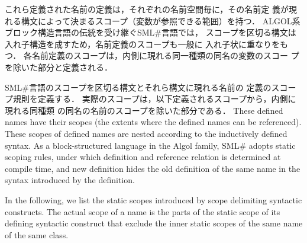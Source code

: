 \documentclass{jbook}
\newcommand{\smlsharp}{SML\#}
\begin{document}
\ifjp%
	これら定義された名前の定義は，それぞれの名前空間毎に，その名前定
義が現れる構文によって決まるスコープ（変数が参照できる範囲）を持つ．
	ALGOL系ブロック構造言語の伝統を受け継ぐ\smlsharp{}言語では，
スコープを区切る構文は入れ子構造を成すため，名前定義のスコープも一般に
入れ子状に重なりをもつ．
	各名前定義のスコープは，内側に現れる同一種類の同名の変数のスコー
プを除いた部分と定義される．
	
	\smlsharp{}言語のスコープを区切る構文とそれら構文に現れる名前の
定義のスコープ規則を定義する．
	実際のスコープは，以下定義されるスコープから，内側に現れる同種類
の同名の名前のスコープを除いた部分である．
\else%
	These defined names have their scopes (the extents where the
defined names can be referenced).
	These scopes of defined names are nested according to the inductively
defined syntax.
	As a block-structured language in the Algol family, \smlsharp{}
adopts static scoping rules, under which definition and reference relation
is determined at compile time, and new definition hides the old
definition of the same name in the syntax introduced by the 
definition.

	In the following, we list the static scopes introduced by scope
delimiting syntactic constructs.
	The actual scope of a name is the parts of
the static scope of its defining syntactic construct
that exclude the inner static scopes of the same name of the same class.
\fi%
\end{document}
